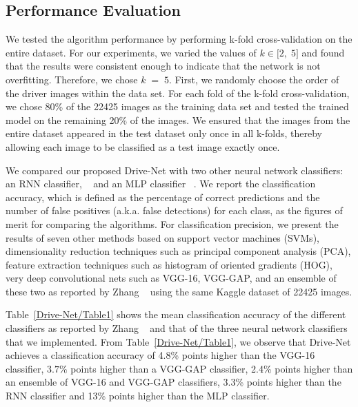 \documentclass[conference,compsoc]{IEEEtran}
\begin{document}
\subsection{Performance Evaluation} We tested the algorithm performance by performing k-fold cross-validation on the entire dataset. For our experiments, we varied the values of $k\in\lbrack2,\;5\rbrack $ and found that the results were consistent enough to indicate that the network is not overfitting. Therefore, we chose $k\;=\;5 $. First, we randomly choose the order of the driver images within the data set. For each fold of the k-fold cross-validation, we chose 80\% of the 22425 images as the training data set and tested the trained model on the remaining 20\% of the images. We ensured that the images from the entire dataset appeared in the test dataset only once in all k-folds, thereby allowing each image to be classified as a test image exactly once.

We compared our proposed Drive-Net with two other neural network classifiers: an RNN classifier, \unskip~\cite{1641075:26775863} and an MLP classifier \unskip~\cite{1641075:26775862}. We report the classification accuracy, which is defined as the percentage of correct predictions and the number of false positives (a.k.a. false detections) for each class, as the figures of merit for comparing the algorithms. For classification precision, we present the results of seven other methods based on support vector machines (SVMs), dimensionality reduction techniques such as principal component analysis (PCA), feature extraction techniques such as histogram of oriented gradients (HOG), very deep convolutional nets such as VGG-16, VGG-GAP, and an ensemble of these two as reported by Zhang \unskip~\cite{1641075:26775851} using the same Kaggle dataset of 22425 images.

Table~\ref{Drive-Net/Table1} shows the mean classification accuracy of the different classifiers as reported by Zhang \unskip~\cite{1641075:26775851} and that of the three neural network classifiers that we implemented. From Table~\ref{Drive-Net/Table1}, we observe that Drive-Net achieves a classification accuracy of 4.8\% points higher than the VGG-16 classifier, $3.7\% $ points higher than a VGG-GAP classifier, 2.4\% points higher than an ensemble of VGG-16 and VGG-GAP classifiers, 3.3\% points higher than the RNN classifier and 13\% points higher than the MLP classifier.
\end{document}
